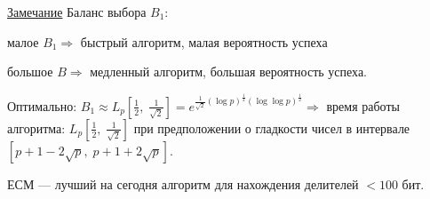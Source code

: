 \documentclass[12pt]{article}
\theoremstyle{definition}
\theoremstyle{definition}
\theoremstyle{definition}
\begin{document}
\underline{Замечание} Баланс выбора $B_1$:

\hspace{5em} малое $B_1 \Rightarrow $ быстрый алгоритм, малая вероятность успеха 

\hspace{5em} большое $B \Rightarrow $ медленный алгоритм, большая вероятность успеха. 

Оптимально: ${B_1} \approx {L_p}[ \frac{1}{2},\;\frac{1}{\sqrt 2 }] = e^{\frac{1}{\sqrt 2 }(\log p)^\frac{1}{2}(\log\log p)^\frac{1}{2}} \Rightarrow $ время работы алгоритма: ${L_p}[ \frac{1}{2},\;\frac{1}{\sqrt 2 }]$ при предположении о гладкости чисел в интервале 
$[ {p + 1 - 2\sqrt p ,\;p + 1 + 2\sqrt p } ]$. 

ЕСМ — лучший на сегодня алгоритм для нахождения делителей $< 100$ бит. 
\end{document}
